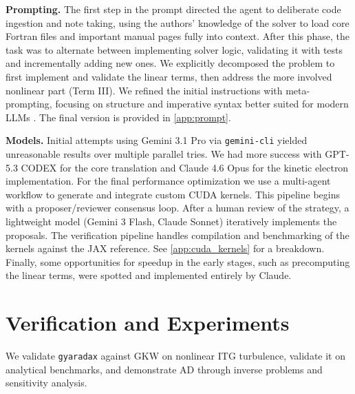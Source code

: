 \documentclass{article}
\theoremstyle{plain}
\theoremstyle{definition}
\theoremstyle{remark}
\newcommand{\JB}[1]{\textcolor{purple}{\textbf{JB: #1}}}
\begin{document}
\textbf{Prompting.}
The first step in the prompt directed the agent to deliberate code ingestion and note taking, using the authors' knowledge of the solver to load core Fortran files and important manual pages fully into context.
%
After this phase, the task was to alternate between implementing solver logic, validating it with tests and incrementally adding new ones.
%
We explicitly decomposed the problem to first implement and validate the linear terms, then address the more involved nonlinear part (Term III).
%
We refined the initial instructions with meta-prompting, focusing on structure and imperative syntax better suited for modern LLMs \cite{zhang2025metapromptingaisystems}. The final version is provided in \cref{app:prompt}.

\textbf{Models.}
Initial attempts using Gemini 3.1 Pro \cite{gemini31pro_2026} via \texttt{gemini-cli} yielded unreasonable results over multiple parallel tries.
%
We had more success with GPT-5.3 CODEX \cite{openai_gpt53_codex_2026} for the core translation and Claude 4.6 Opus \cite{anthropic2026claude46opus} for the kinetic electron implementation.
%
For the final performance optimization we use a multi-agent workflow to generate and integrate custom CUDA kernels. This pipeline begins with a proposer/reviewer consensus loop. 
%
After a human review of the strategy, a lightweight model (Gemini 3 Flash, Claude Sonnet) iteratively implements the proposals. The verification pipeline handles compilation and benchmarking of the kernels against the JAX reference. See \cref{app:cuda_kernels} for a breakdown.
%
Finally, some opportunities for speedup in the early stages, such as precomputing the linear terms, were spotted and implemented entirely by Claude.


\section{Verification and Experiments}
\label{sec:verexp}
We validate \texttt{gyaradax} against GKW on nonlinear ITG turbulence, validate it on analytical benchmarks, and demonstrate AD through inverse problems and sensitivity analysis.

\end{document}
